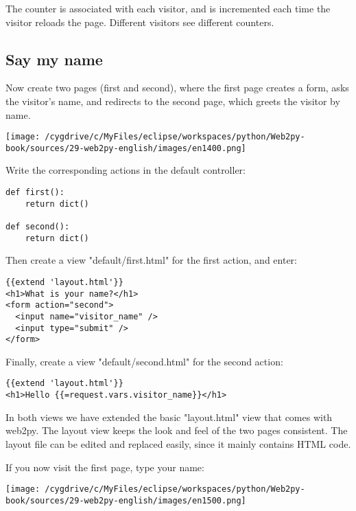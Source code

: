 \documentclass[justified,sixbynine,notoc]{tufte-book}
\def\inxx#1{\index{#1}}
\begin{document}
\begin{fullwidth}
The counter is associated with each visitor, and is incremented each time the visitor reloads the page. Different visitors see different counters.

\goodbreak\subsection{Say my name}

\inxx{form} \inxx{request.vars}

Now create two pages (first and second), where the first page creates a form, asks the visitor's name, and redirects to the second page, which greets the visitor by name.


\goodbreak\begin{center}\texttt{[image: /cygdrive/c/MyFiles/eclipse/workspaces/python/Web2py-book/sources/29-web2py-english/images/en1400.png]}\end{center}


Write the corresponding actions in the default controller:
\begin{lstlisting}
def first():
    return dict()

def second():
    return dict()
\end{lstlisting}

Then create a view "default/first.html" for the first action,
and enter:
\begin{lstlisting}[keywords={}]
{{extend 'layout.html'}}
<h1>What is your name?</h1>
<form action="second">
  <input name="visitor_name" />
  <input type="submit" />
</form>
\end{lstlisting}

Finally, create a view "default/second.html" for the second action:
\begin{lstlisting}[keywords={}]
{{extend 'layout.html'}}
<h1>Hello {{=request.vars.visitor_name}}</h1>
\end{lstlisting}

\inxx{layout}
In both views we have extended the basic "layout.html" view that comes with web2py. The layout view keeps the look and feel of the two pages consistent. The layout file can be edited and replaced easily, since it mainly contains HTML code.

If you now visit the first page, type your name:


\goodbreak\begin{center}\texttt{[image: /cygdrive/c/MyFiles/eclipse/workspaces/python/Web2py-book/sources/29-web2py-english/images/en1500.png]}\end{center}


\end{fullwidth}
\end{document}

